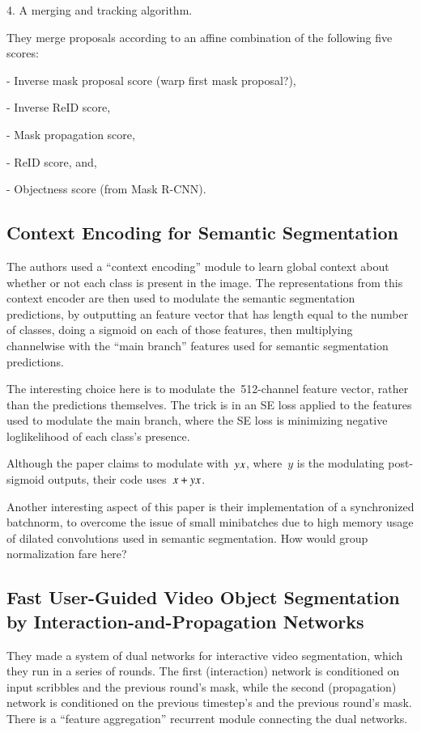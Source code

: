 \documentclass[a4paper, 12pt]{article}
\begin{document}
4. A merging and tracking algorithm.


They merge proposals according to an affine combination of the following five
scores:

- Inverse mask proposal score (warp first mask proposal?),

- Inverse ReID score,

- Mask propagation score,

- ReID score, and,

- Objectness score (from Mask R-CNN).


\subsection{Context Encoding for Semantic Segmentation~\cite{Zhang_2018_CVPR}}

The authors used a ``context encoding'' module to learn global context about
whether or not each class is present in the image. The representations from
this context encoder are then used to modulate the semantic segmentation
predictions, by outputting an feature vector that has length equal to the
number of classes, doing a sigmoid on each of those features, then multiplying
channelwise with the ``main branch'' features used for semantic segmentation
predictions.

The interesting choice here is to modulate the~\num{512}-channel feature
vector, rather than the predictions themselves. The trick is in an SE loss
applied to the features used to modulate the main branch, where the SE loss is
minimizing negative loglikelihood of each class's presence.

Although the paper claims to modulate with~$y \* x$, where~$y$ is the
modulating post-sigmoid outputs, their code uses~$x + y \* x$.

Another interesting aspect of this paper is their implementation of a
synchronized batchnorm, to overcome the issue of small minibatches due to high
memory usage of dilated convolutions used in semantic segmentation. How would
group normalization fare here?


\subsection{Fast User-Guided Video Object Segmentation by
            Interaction-and-Propagation Networks~\cite{oh2019fast}}

They made a system of dual networks for interactive video segmentation, which
they run in a series of rounds. The first (interaction) network is conditioned
on input scribbles and the previous round's mask, while the second
(propagation) network is conditioned on the previous timestep's and the
previous round's mask. There is a ``feature aggregation'' recurrent module
connecting the dual networks.
\end{document}
